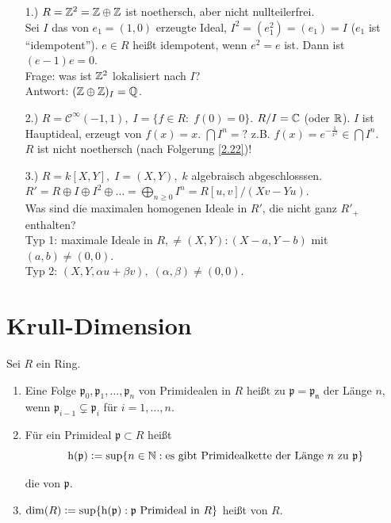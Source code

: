 \documentclass[a4paper, 10pt]{report}
\begin{document}
\begin{nnBsp}
  \begin{enumerate}
    \item[1.)] $R = \mathbb{Z}^2 = \mathbb{Z} \oplus \mathbb{Z}$ ist noethersch, aber nicht nullteilerfrei.\\
    Sei $I$ das von $e_1 = (1,0)$ erzeugte Ideal, $I^2 = (e_1^2)= (e_1) = I$ ($e_1$ ist "`idempotent"').
    $e \in R$ heißt idempotent, wenn $e^2 = e$ ist. Dann ist $(e-1)e = 0$.\\
    Frage: was ist $\mathbb{Z}^2$ lokalisiert nach $I$?\\
    Antwort: $(\mathbb{Z} \oplus \mathbb{Z})_I = \mathbb{Q}$.
    \item[2.)] $R = \mathcal{C}^{\infty}(-1,1), \; I = \{f \in R: \; f(0)=0\}$. $R/I = \mathbb{C}$ (oder $\mathbb{R}$).
    $I$ ist Hauptideal, erzeugt von $f(x) = x$. $\bigcap I^n = ?$ z.B. $f(x) = e^{-\frac{1}{x^2}} \in \bigcap I^n$.\\
    $R$ ist nicht noethersch (nach Folgerung \ref{2.22})!
    \item[3.)] $R = k[X,Y], \; I = (X,Y), \; k$ algebraisch abgeschlosssen.\\
    $R' = R \oplus I \oplus I^2 \oplus \dots = \bigoplus_{n \geq 0} I^n = R[u,v]/(X v - Y u)$.\\
    Was sind die maximalen homogenen Ideale in $R'$, die nicht ganz $R'_+$ enthalten?\\
    Typ 1: maximale Ideale in $R, \not= (X,Y): (X-a, Y-b)$ mit $(a,b) \not=(0,0)$.\\
    Typ 2: $(X,Y, \alpha u + \beta v), \; (\alpha, \beta) \not= (0,0)$.
  \end{enumerate}
\end{nnBsp}

\section{Krull-Dimension}

\begin{Def}
\label{2.24}
Sei $R$ ein Ring. 
\begin{enumerate}

\item Eine Folge $\mathfrak{p}_0, \mathfrak{p}_1, \dots ,\mathfrak{p}_n$
von Primidealen in $R$ hei\ss t  zu $\mathfrak{p}=\mathfrak{p_n}$
der L\"ange $n$, wenn $\mathfrak{p}_{i-1}\subsetneq \mathfrak{p}_i$ f\"ur $i=1,\ldots, n$.

\item F\"ur ein Primideal $\mathfrak{p}\subset R$ hei\ss t
$$ \hoe{\mathfrak{p}}\defeqr\sup\{n\in\NN:
\text{es gibt Primidealkette der L\"ange}\ n\ \text{zu}\ \mathfrak{p}\} $$

die 
von $\mathfrak{p}$.

\item $\dim{R} \defeqr\sup\{\hoe{\mathfrak{p}}:\mathfrak{p}
\text{ Primideal in }R\}$
hei\ss t  von $R$.

\end{enumerate}
\end{Def}
\end{document}
